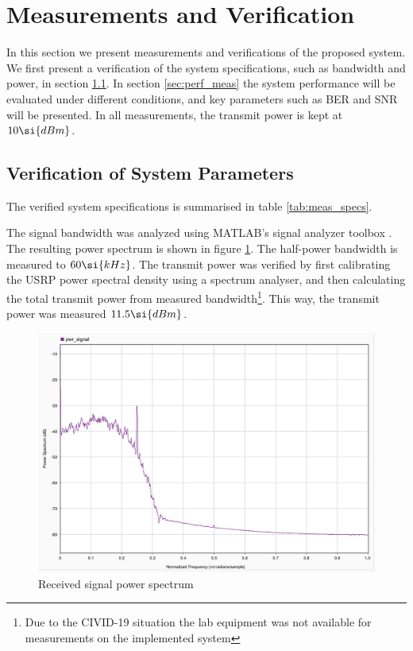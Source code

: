 \section{Measurements and Verification}
\label{sec:verification}
In this section we present measurements and verifications of the proposed system. We first present a verification of the system specifications, such as bandwidth and power, in section \ref{sec:specs_verification}. In section \ref{sec:perf_meas} the system performance will be evaluated under different conditions, and key parameters such as BER and SNR will be presented. In all measurements, the transmit power is kept at $\paPower \si{dBm}$.

\subsection{Verification of System Parameters}
\label{sec:specs_verification}
The verified system specifications is summarised in table \ref{tab:meas_specs}.


The signal bandwidth was analyzed using MATLAB's signal analyzer toolbox \cite{signalAnalyzer}. The resulting power spectrum is shown in figure \ref{fig:pwr_spectrum}. The half-power bandwidth is measured to $\measBW \si{kHz}$.
The transmit power was verified by first calibrating the USRP power spectral density using a spectrum analyser, and then calculating the total transmit power from measured bandwidth\footnote{Due to the CIVID-19 situation the lab equipment was not available for measurements on the implemented system}. This way, the transmit power was measured $\measPWR \si{dBm}$.

\begin{figure}[htbp]
\begin{center}
\includegraphics[width=\figW\linewidth]{spectrum.png}
\caption{Received signal power spectrum}
\label{fig:pwr_spectrum}
\end{center}
\end{figure}

